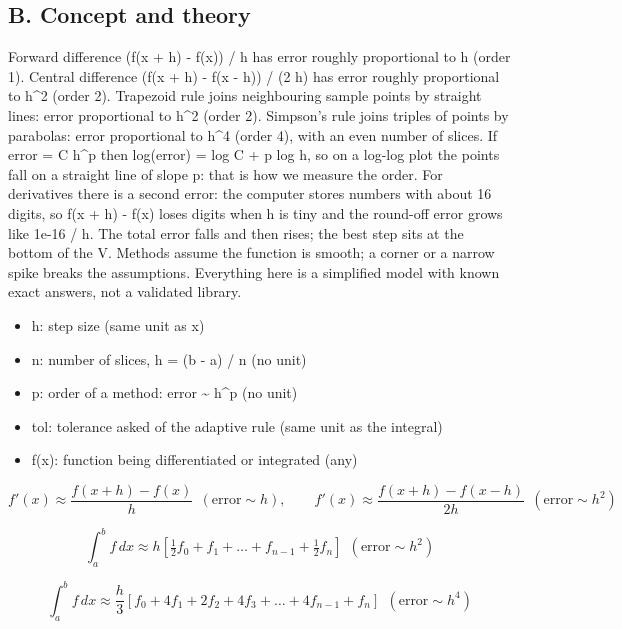 \documentclass[11pt,a4paper]{article}
\begin{document}
\subsection*{B. Concept and theory}
Forward difference (f(x + h) - f(x)) / h has error roughly proportional to h (order 1). Central difference (f(x + h) - f(x - h)) / (2 h) has error roughly proportional to h\textasciicircum{}2 (order 2). Trapezoid rule joins neighbouring sample points by straight lines: error proportional to h\textasciicircum{}2 (order 2). Simpson's rule joins triples of points by parabolas: error proportional to h\textasciicircum{}4 (order 4), with an even number of slices. If error = C h\textasciicircum{}p then log(error) = log C + p log h, so on a log-log plot the points fall on a straight line of slope p: that is how we measure the order. For derivatives there is a second error: the computer stores numbers with about 16 digits, so f(x + h) - f(x) loses digits when h is tiny and the round-off error grows like 1e-16 / h. The total error falls and then rises; the best step sits at the bottom of the V. Methods assume the function is smooth; a corner or a narrow spike breaks the assumptions. Everything here is a simplified model with known exact answers, not a validated library.

\begin{itemize}[nosep]
\item h: step size (same unit as x)
\item n: number of slices, h = (b - a) / n (no unit)
\item p: order of a method: error \textasciitilde{} h\textasciicircum{}p (no unit)
\item tol: tolerance asked of the adaptive rule (same unit as the integral)
\item f(x): function being differentiated or integrated (any)
\end{itemize}

\begin{equation*}
f'(x)\approx\frac{f(x+h)-f(x)}{h}\ \ (\text{error}\sim h),\qquad f'(x)\approx\frac{f(x+h)-f(x-h)}{2h}\ \ (\text{error}\sim h^2)
\end{equation*}

\begin{equation*}
\int_a^b f\,dx\approx h\left[\tfrac12 f_0+f_1+\dots+f_{n-1}+\tfrac12 f_n\right]\ \ (\text{error}\sim h^2)
\end{equation*}

\begin{equation*}
\int_a^b f\,dx\approx\frac h3\left[f_0+4f_1+2f_2+4f_3+\dots+4f_{n-1}+f_n\right]\ \ (\text{error}\sim h^4)
\end{equation*}
\end{document}
